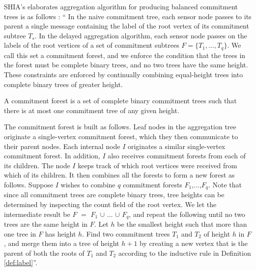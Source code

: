 		SHIA's elaborates aggregation algorithm for producing balanced commitment trees is as follows \cite{chan2006secure}: 
		`` In the naive commitment tree, each sensor node passes to its parent a single message containing the label of the root vertex of its commitment subtree $T_{s}$.
		In the delayed aggregation algorithm, each sensor node passes on the labels of the root vertices of a set of commitment subtrees $F = \{ T_{1}, \dotsc, T_{q} \}$.
		We call this set a commitment forest, and we enforce the condition that the trees in the forest must be complete binary trees, and no two trees have the same height. 
		These constraints are enforced by continually combining equal-height trees into complete binary trees of greater height.
		\begin{definition}
			\cite{chan2006secure}
			\label{def:commitment-forest}
			A commitment forest is a set of complete binary commitment trees such that there is at most one commitment tree of any given height.
		\end{definition}
		The commitment forest is built as follows. 
		Leaf nodes in the aggregation tree originate a single-vertex commitment forest, which they then communicate to their parent nodes. 
		Each internal node $I$ originates a similar single-vertex commitment forest.
		In addition, $I$ also receives commitment forests from each of its children.
		The node $I$ keeps track of which root vertices were received from which of its children.
		It then combines all the forests to form a new forest as follows.
		Suppose $I$ wishes to combine $q$ commitment forests $F_{1}$,$\dotsc$,$F_{q}$.
		Note that since all commitment trees are complete binary trees, tree heights can be determined by inspecting the count field of the root vertex.
		We let the intermediate result be $F$ $=$ $F_{1}$ $\cup$ $\dotsc$ $\cup$ $F_{q}$, and repeat the following until no two trees are the same height in $F$.
		Let $h$ be the smallest height such that more than one tree in $F$ has height $h$.
		Find two commitment trees $T_{1}$ and $T_{2}$ of height $h$ in $F$, and merge them into a tree of height $h + 1$ by creating a new vertex that is the parent of both the roots of $T_{1}$ and $T_{2}$ according to the inductive rule in Definition \ref{def:label}''.
		
